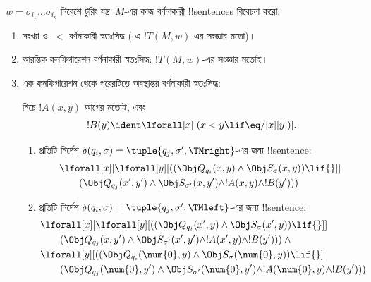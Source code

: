 \documentclass[../../../include/open-logic-section]{subfiles}
\begin{document}
$w=\sigma_{i_1}\dots\sigma_{i_k}$ নিবেশে টুরিং যন্ত্র~$M$-এর কাজ
বর্ণনাকারী !!{sentence}s বিবেচনা করো:
\begin{enumerate}
\item সংখ্যা ও~$<$ বর্ণনাকারী স্বতঃসিদ্ধ
  (-এ $!T(M,w)$-এর সংজ্ঞার মতো)।
\item আরম্ভিক কনফিগারেশন বর্ণনাকারী স্বতঃসিদ্ধ: $!T(M,w)$-এর সংজ্ঞার
  মতোই।
\item এক কনফিগারেশন থেকে পরেরটিতে অবস্থান্তর বর্ণনাকারী স্বতঃসিদ্ধ:

নিচে $!A(x,y)$ আগের মতোই, এবং
\[
  !B(y) \ident \lforall[x][(x < y \lif \eq/[x][y])].
\]
\begin{enumerate}
\item {} প্রতিটি নির্দেশ
$\delta(q_i,\sigma)=\tuple{q_j,\sigma',\TMright}$-এর জন্য !!{sentence}:
\begin{align*}
& \lforall[x][\lforall[y][(
   (\Obj Q_{q_i}(x, y) \land \Obj S_{\sigma}(x, y)) \lif {}]] \\
&\qquad   (\Obj Q_{q_j}(x', y') \land \Obj S_{\sigma'}(x, y') \land
!A(x, y) \land !B(y')))
\end{align*}
\item {} প্রতিটি নির্দেশ
$\delta(q_i,\sigma)=\tuple{q_j,\sigma',\TMleft}$-এর জন্য !!{sentence}:
\begin{align*}
& \lforall[x][\lforall[y][
    ((\Obj Q_{q_i}(x', y) \land \Obj S_{\sigma}(x', y)) \lif {}]]\\
& \qquad   (\Obj Q_{q_j}(x, y') \land \Obj S_{\sigma'}(x', y') \land
!A(x', y) \land !B(y'))) \land {}\\
& \lforall[y][((\Obj Q_{q_i}(\num{0}, y) \land \Obj S_{\sigma}(\num{0},
    y)) \lif {}]\\
& \qquad (\Obj Q_{q_j}(\num{0}, y') \land \Obj S_{\sigma'}(\num{0},
  y') \land !A(\num{0}, y) \land !B(y')))
\end{align*}


\end{enumerate}
\end{enumerate}
\end{document}
